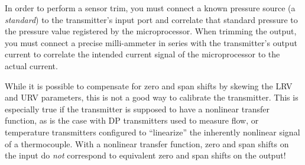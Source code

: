 \vskip 10pt

In order to perform a sensor trim, you must connect a known pressure source (a {\it standard}) to the transmitter's input port and correlate that standard pressure to the pressure value registered by the microprocessor.  When trimming the output, you must connect a precise milli-ammeter in series with the transmitter's output current to correlate the intended current signal of the microprocessor to the actual current.







While it is possible to compensate for zero and span shifts by skewing the LRV and URV parameters, this is not a good way to calibrate the transmitter.  This is especially true if the transmitter is supposed to have a nonlinear transfer function, as is the case with DP transmitters used to measure flow, or temperature transmitters configured to ``linearize'' the inherently nonlinear signal of a thermocouple.  With a nonlinear transfer function, zero and span shifts on the input do {\it not} correspond to equivalent zero and span shifts on the output!




